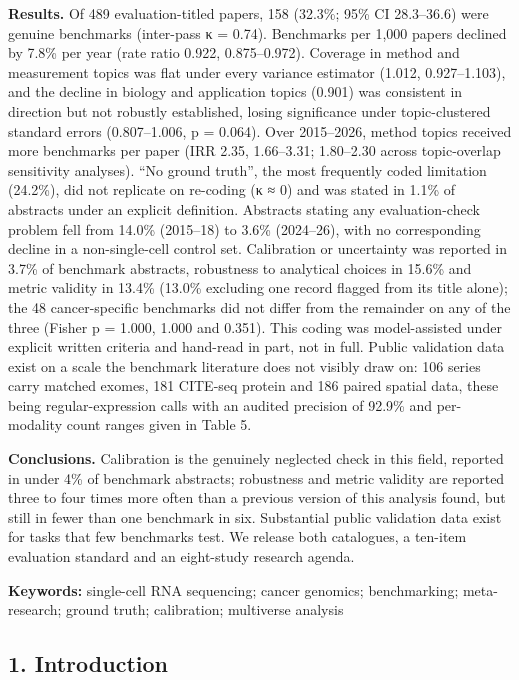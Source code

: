 \documentclass[11pt]{article}
\begin{document}
\textbf{Results.} Of 489 evaluation-titled papers, 158 (32.3\%; 95\% CI
28.3--36.6) were genuine benchmarks (inter-pass κ = 0.74). Benchmarks
per 1,000 papers declined by 7.8\% per year (rate ratio 0.922,
0.875--0.972). Coverage in method and measurement topics was flat under
every variance estimator (1.012, 0.927--1.103), and the decline in
biology and application topics (0.901) was consistent in direction but
not robustly established, losing significance under topic-clustered
standard errors (0.807--1.006, p = 0.064). Over 2015--2026, method
topics received more benchmarks per paper (IRR 2.35, 1.66--3.31;
1.80--2.30 across topic-overlap sensitivity analyses). ``No ground
truth'', the most frequently coded limitation (24.2\%), did not
replicate on re-coding (κ ≈ 0) and was stated in 1.1\% of abstracts
under an explicit definition. Abstracts stating any evaluation-check
problem fell from 14.0\% (2015--18) to 3.6\% (2024--26), with no
corresponding decline in a non-single-cell control set. Calibration or
uncertainty was reported in 3.7\% of benchmark abstracts, robustness to
analytical choices in 15.6\% and metric validity in 13.4\% (13.0\%
excluding one record flagged from its title alone); the 48
cancer-specific benchmarks did not differ from the remainder on any of
the three (Fisher p = 1.000, 1.000 and 0.351). This coding was
model-assisted under explicit written criteria and hand-read in part,
not in full. Public validation data exist on a scale the benchmark
literature does not visibly draw on: 106 series carry matched exomes,
181 CITE-seq protein and 186 paired spatial data, these being
regular-expression calls with an audited precision of 92.9\% and
per-modality count ranges given in Table 5.

\textbf{Conclusions.} Calibration is the genuinely neglected check in
this field, reported in under 4\% of benchmark abstracts; robustness and
metric validity are reported three to four times more often than a
previous version of this analysis found, but still in fewer than one
benchmark in six. Substantial public validation data exist for tasks
that few benchmarks test. We release both catalogues, a ten-item
evaluation standard and an eight-study research agenda.

\textbf{Keywords:} single-cell RNA sequencing; cancer genomics;
benchmarking; meta-research; ground truth; calibration; multiverse
analysis

\subsection{1. Introduction}\label{introduction}
\end{document}
